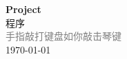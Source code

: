 \vspace*{\fill}
\begin{center}
    \textcolor{orange!50}{\Huge\textbf{Project}} \\[1em]
    \textcolor{orange!60!pink}{\Large 程序} \\[2em]
    \textcolor{gray}{\large 手指敲打键盘如你敲击琴键} \\[1em]
    \today
\end{center}
\vspace*{\fill}
\clearpage


\clearpage

\clearpage




